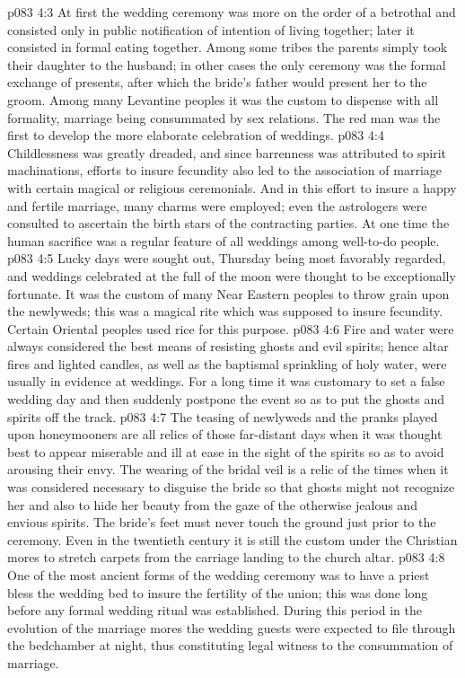 \vs p083 4:3 At first the wedding ceremony was more on the order of a betrothal and consisted only in public notification of intention of living together; later it consisted in formal eating together. Among some tribes the parents simply took their daughter to the husband; in other cases the only ceremony was the formal exchange of presents, after which the bride’s father would present her to the groom. Among many Levantine peoples it was the custom to dispense with all formality, marriage being consummated by sex relations. The red man was the first to develop the more elaborate celebration of weddings.
\vs p083 4:4 \pc Childlessness was greatly dreaded, and since barrenness was attributed to spirit machinations, efforts to insure fecundity also led to the association of marriage with certain magical or religious ceremonials. And in this effort to insure a happy and fertile marriage, many charms were employed; even the astrologers were consulted to ascertain the birth stars of the contracting parties. At one time the human sacrifice was a regular feature of all weddings among well\hyp{}to\hyp{}do people.
\vs p083 4:5 Lucky days were sought out, Thursday being most favorably regarded, and weddings celebrated at the full of the moon were thought to be exceptionally fortunate. It was the custom of many Near Eastern peoples to throw grain upon the newlyweds; this was a magical rite which was supposed to insure fecundity. Certain Oriental peoples used rice for this purpose.
\vs p083 4:6 Fire and water were always considered the best means of resisting ghosts and evil spirits; hence altar fires and lighted candles, as well as the baptismal sprinkling of holy water, were usually in evidence at weddings. For a long time it was customary to set a false wedding day and then suddenly postpone the event so as to put the ghosts and spirits off the track.
\vs p083 4:7 The teasing of newlyweds and the pranks played upon honeymooners are all relics of those far\hyp{}distant days when it was thought best to appear miserable and ill at ease in the sight of the spirits so as to avoid arousing their envy. The wearing of the bridal veil is a relic of the times when it was considered necessary to disguise the bride so that ghosts might not recognize her and also to hide her beauty from the gaze of the otherwise jealous and envious spirits. The bride’s feet must never touch the ground just prior to the ceremony. Even in the twentieth century it is still the custom under the Christian mores to stretch carpets from the carriage landing to the church altar.
\vs p083 4:8 One of the most ancient forms of the wedding ceremony was to have a priest bless the wedding bed to insure the fertility of the union; this was done long before any formal wedding ritual was established. During this period in the evolution of the marriage mores the wedding guests were expected to file through the bedchamber at night, thus constituting legal witness to the consummation of marriage.
